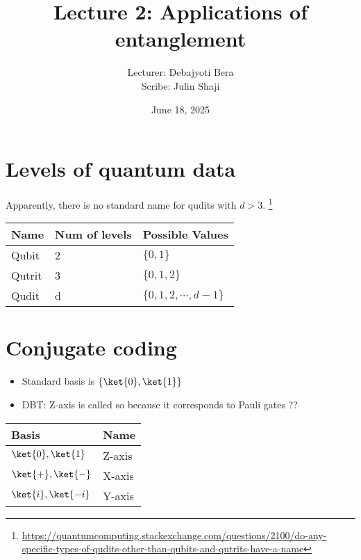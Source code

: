 \documentclass[12pt]{article}
\begin{document}
\title{Lecture 2: Applications of entanglement}
\author{Lecturer: Debajyoti Bera\\ Scribe: Julin Shaji}
\date{June 18, 2025}
\maketitle

\section{Levels of quantum data}
Apparently, there is no standard name for qudits with $d > 3$.
\footnote{\url{https://quantumcomputing.stackexchange.com/questions/2100/do-any-specific-types-of-qudits-other-than-qubits-and-qutrits-have-a-name}}

\begin{center}
\begin{tabular}{lll}
\toprule
Name   & Num of levels & Possible Values            \\
\midrule
Qubit  & 2             & $\{0, 1\}$                 \\
Qutrit & 3             & $\{0, 1, 2\}$              \\
Qudit  & d             & $\{0, 1, 2, \cdots, d-1\}$ \\
\bottomrule
\end{tabular}
\end{center}

\section{Conjugate coding}
\begin{itemize}
\item Standard basis is $\{\ket{0}, \ket{1}\}$
\item DBT: Z-axis is called so because it corresponds to Pauli gates ??
\end{itemize}

\begin{center}
\begin{tabular}{ll}
  \toprule
  Basis             & Name   \\
  \midrule
$\ket{0}, \ket{1}$  & Z-axis \\
$\ket{+}, \ket{-}$  & X-axis \\
$\ket{i}, \ket{-i}$ & Y-axis \\
  \bottomrule
\end{tabular}
\end{center}
\end{document}
